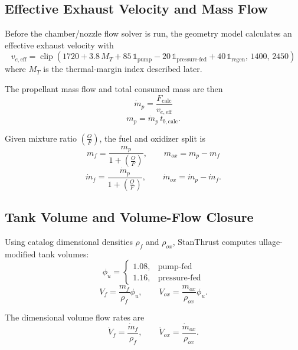 \documentclass[11pt]{article}
\newcommand{\clip}{\operatorname{clip}}
\newcommand{\mdotp}{\dot{m}_{p}}
\newcommand{\mdotf}{\dot{m}_{f}}
\newcommand{\mdoto}{\dot{m}_{ox}}
\newcommand{\OF}{\left(\frac{O}{F}\right)}
\begin{document}
\subsection{Effective Exhaust Velocity and Mass Flow}
Before the chamber/nozzle flow solver is run, the geometry model calculates an effective exhaust velocity with
\begin{equation}
v_{e,\text{eff}}
=
\clip\!\left(
1720
+3.8\,M_T
+85\,\mathbb{1}_{\text{pump}}
-20\,\mathbb{1}_{\text{pressure-fed}}
+40\,\mathbb{1}_{\text{regen}},
\,
1400,\,
2450
\right)
\label{eq:veff}
\end{equation}
where $M_T$ is the thermal-margin index described later.

The propellant mass flow and total consumed mass are then
\begin{equation}
\mdotp=\frac{F_{\text{calc}}}{v_{e,\text{eff}}}
\label{eq:mdot-total}
\end{equation}
\begin{equation}
m_p=\mdotp\,t_{b,\text{calc}}.
\label{eq:mp-total}
\end{equation}

Given mixture ratio $\OF$, the fuel and oxidizer split is
\begin{equation}
m_f=\frac{m_p}{1+\OF},
\qquad
m_{ox}=m_p-m_f
\label{eq:mass-split}
\end{equation}
\begin{equation}
\mdotf=\frac{\mdotp}{1+\OF},
\qquad
\mdoto=\mdotp-\mdotf.
\label{eq:mdot-split}
\end{equation}

\subsection{Tank Volume and Volume-Flow Closure}
Using catalog dimensional densities $\rho_f$ and $\rho_{ox}$, StanThrust computes ullage-modified tank volumes:
\begin{equation}
\phi_u=
\begin{cases}
1.08, & \text{pump-fed}\\
1.16, & \text{pressure-fed}
\end{cases}
\label{eq:ullage}
\end{equation}
\begin{equation}
V_f=\frac{m_f}{\rho_f}\phi_u,
\qquad
V_{ox}=\frac{m_{ox}}{\rho_{ox}}\phi_u.
\label{eq:volumes}
\end{equation}

The dimensional volume flow rates are
\begin{equation}
\dot{V}_f=\frac{\mdotf}{\rho_f},
\qquad
\dot{V}_{ox}=\frac{\mdoto}{\rho_{ox}}.
\label{eq:volume-flows}
\end{equation}
\end{document}
